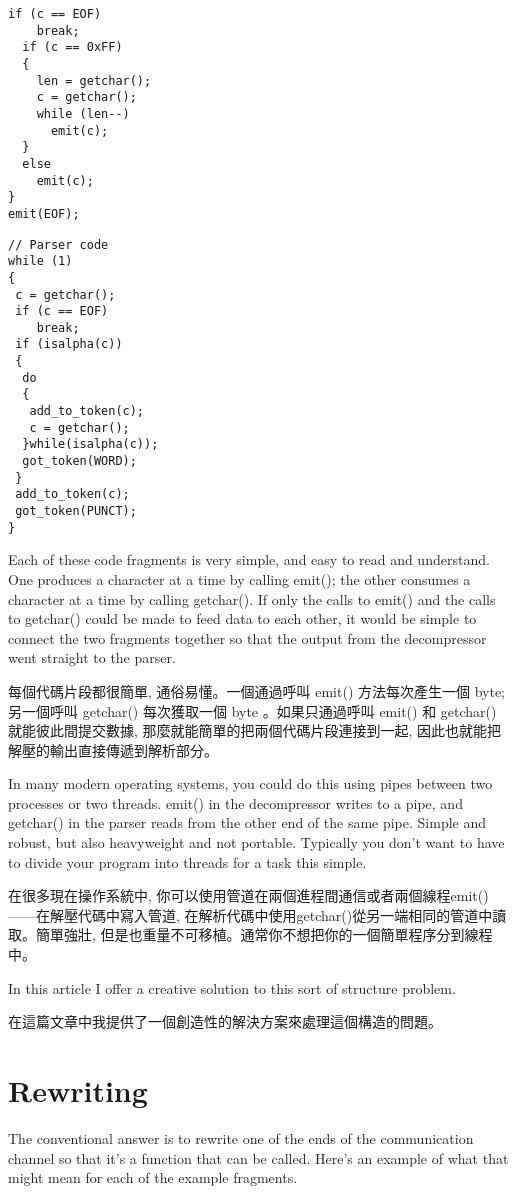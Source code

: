 \documentclass[12pt]{article}
\begin{document}
\begin{CJK}{UTF8}{bsmi}
\begin{multicols}{2}
\begin{lstlisting}[caption=decompression, basicstyle=\footnotesize, breaklines=true, frame=single,frameround=tttt]
  if (c == EOF)
    break;
  if (c == 0xFF) 
  {
    len = getchar();
    c = getchar();
    while (len--)
      emit(c);
  } 
  else
    emit(c);
}
emit(EOF);
\end{lstlisting}

\begin{lstlisting}[caption=parser, basicstyle=\footnotesize, breaklines=true, frame=single,frameround=tttt]
// Parser code 
while (1) 
{
 c = getchar();
 if (c == EOF)
    break;
 if (isalpha(c)) 
 {
  do 
  {
   add_to_token(c);
   c = getchar();
  }while(isalpha(c));
  got_token(WORD);
 }
 add_to_token(c);
 got_token(PUNCT);
}

\end{lstlisting}
\end{multicols}

 Each of these code fragments is very simple, and easy to read and understand. One produces a character at a time by calling emit(); the other consumes a character at a time by calling getchar(). If only the calls to emit() and the calls to getchar() could be made to feed data to each other, it would be simple to connect the two fragments together so that the output from the decompressor went straight to the parser.

每個代碼片段都很簡單, 通俗易懂。一個通過呼叫 emit() 方法每次產生一個 byte; 另一個呼叫 getchar() 每次獲取一個 byte 。如果只通過呼叫
emit() 和 getchar() 就能彼此間提交數據, 那麼就能簡單的把兩個代碼片段連接到一起, 因此也就能把解壓的輸出直接傳遞到解析部分。

 In many modern operating systems, you could do this using pipes between two processes or two threads. emit() in the decompressor writes to a pipe, and getchar() in the parser reads from the other end of the same pipe. Simple and robust, but also heavyweight and not portable. Typically you don't want to have to divide your program into threads for a task this simple.

在很多現在操作系統中, 你可以使用管道在兩個進程間通信或者兩個線程emit()——在解壓代碼中寫入管道, 在解析代碼中使用getchar()從另一端相同的管道中讀取。簡單強壯, 但是也重量不可移植。通常你不想把你的一個簡單程序分到線程中。

In this article I offer a creative solution to this sort of structure problem. 

在這篇文章中我提供了一個創造性的解決方案來處理這個構造的問題。 

\section{Rewriting}
 The conventional answer is to rewrite one of the ends of the communication channel so that it's a function that can be called. Here's an example of what that might mean for each of the example fragments.


\end{CJK}
\end{document}
